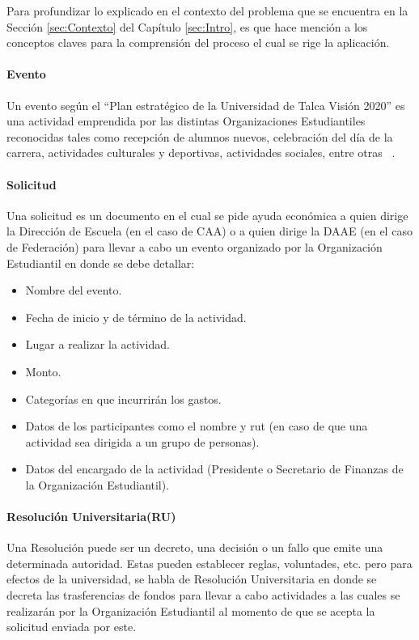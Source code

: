 Para profundizar lo explicado en el contexto del problema que se encuentra en la Sección \ref{sec:Contexto} del Capítulo \ref{sec:Intro}, es que hace mención a los conceptos claves para la comprensión del proceso el cual se rige la aplicación.

\paragraph{Evento}

  Un evento según el ``Plan estratégico de la Universidad de Talca Visión 2020'' es una actividad emprendida por las distintas Organizaciones Estudiantiles reconocidas tales como recepción de alumnos nuevos, celebración del día de la carrera, actividades culturales y deportivas, actividades sociales, entre otras ~\cite{5}. 

\paragraph{Solicitud}

  Una solicitud es un documento en el cual se pide ayuda económica a quien dirige la Dirección de Escuela (en el caso de CAA) o a quien dirige la DAAE (en el caso de Federación) para llevar a cabo un evento organizado por la Organización Estudiantil en donde se debe detallar:

  \begin{itemize}
      \item Nombre del evento.
      \item Fecha de inicio y de término de la actividad.
      \item Lugar a realizar la actividad. 
      \item Monto. 
      \item Categorías en que incurrirán los gastos.
      \item Datos de los participantes como el nombre y rut (en caso de que una actividad sea dirigida a un grupo de personas). 
      \item Datos del encargado de la actividad (Presidente o Secretario de Finanzas de la Organización Estudiantil).
  \end{itemize}

\paragraph{Resolución Universitaria(RU)}

  Una Resolución puede ser un decreto, una decisión o un fallo que emite una determinada autoridad. Estas pueden establecer reglas, voluntades, etc. pero para efectos de la universidad, se habla de Resolución Universitaria en donde se decreta las trasferencias de fondos para llevar a cabo actividades a las cuales se realizarán por la Organización Estudiantil al momento de que se acepta la solicitud enviada por este.

